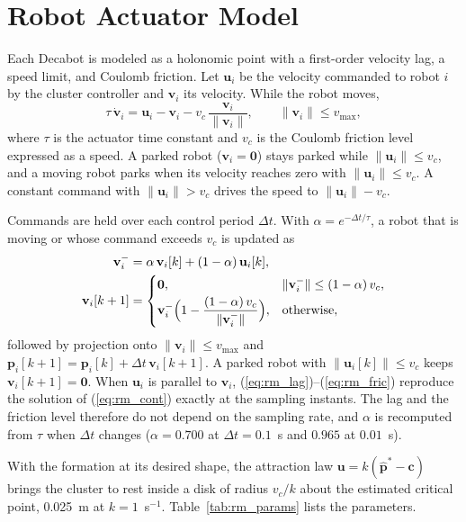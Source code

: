 \documentclass[journal]{IEEEtran}
\begin{document}
\section*{Robot Actuator Model}

Each Decabot is modeled as a holonomic point with a first-order velocity lag, a speed limit, and Coulomb friction. Let $\mathbf{u}_i$ be the velocity commanded to robot $i$ by the cluster controller and $\mathbf{v}_i$ its velocity. While the robot moves,
\begin{equation}
\tau\,\dot{\mathbf{v}}_i = \mathbf{u}_i - \mathbf{v}_i - v_c\,\frac{\mathbf{v}_i}{\|\mathbf{v}_i\|}, \qquad \|\mathbf{v}_i\| \le v_{\max},
\label{eq:rm_cont}
\end{equation}
where $\tau$ is the actuator time constant and $v_c$ is the Coulomb friction level expressed as a speed. A parked robot ($\mathbf{v}_i = \mathbf{0}$) stays parked while $\|\mathbf{u}_i\| \le v_c$, and a moving robot parks when its velocity reaches zero with $\|\mathbf{u}_i\| \le v_c$. A constant command with $\|\mathbf{u}_i\| > v_c$ drives the speed to $\|\mathbf{u}_i\| - v_c$.

Commands are held over each control period $\Delta t$. With $\alpha = e^{-\Delta t/\tau}$, a robot that is moving or whose command exceeds $v_c$ is updated as
\begin{align}
\mathbf{v}_i^{-} &= \alpha\,\mathbf{v}_i[k] + (1-\alpha)\,\mathbf{u}_i[k], \label{eq:rm_lag}\\
\mathbf{v}_i[k+1] &=
\begin{cases}
\mathbf{0}, & \|\mathbf{v}_i^{-}\| \le (1-\alpha)\,v_c,\\[2pt]
\mathbf{v}_i^{-}\Bigl(1 - \dfrac{(1-\alpha)\,v_c}{\|\mathbf{v}_i^{-}\|}\Bigr), & \text{otherwise},
\end{cases} \label{eq:rm_fric}
\end{align}
followed by projection onto $\|\mathbf{v}_i\| \le v_{\max}$ and $\mathbf{p}_i[k+1] = \mathbf{p}_i[k] + \Delta t\,\mathbf{v}_i[k+1]$. A parked robot with $\|\mathbf{u}_i[k]\| \le v_c$ keeps $\mathbf{v}_i[k+1] = \mathbf{0}$. When $\mathbf{u}_i$ is parallel to $\mathbf{v}_i$, (\ref{eq:rm_lag})--(\ref{eq:rm_fric}) reproduce the solution of (\ref{eq:rm_cont}) exactly at the sampling instants. The lag and the friction level therefore do not depend on the sampling rate, and $\alpha$ is recomputed from $\tau$ when $\Delta t$ changes ($\alpha = 0.700$ at $\Delta t = 0.1$~s and $0.965$ at $0.01$~s).

With the formation at its desired shape, the attraction law $\mathbf{u} = k(\hat{\mathbf{p}}^* - \mathbf{c})$ brings the cluster to rest inside a disk of radius $v_c/k$ about the estimated critical point, 0.025~m at $k = 1$~s$^{-1}$. Table~\ref{tab:rm_params} lists the parameters.
\end{document}
